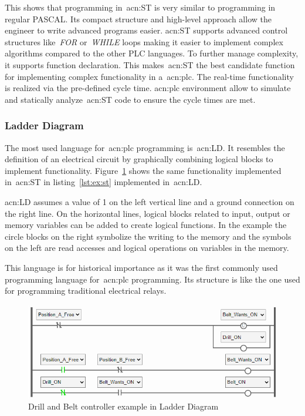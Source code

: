 This shows that programming in~\acrshort{acn:ST} is very similar to programming in regular PASCAL.
Its compact structure and high-level approach allow the engineer to write advanced programs easier.
\acrshort{acn:ST} supports advanced control structures like~\textit{FOR} or~\textit{WHILE} loops making it easier to implement complex algorithms compared to the other PLC languages. 
To further manage complexity, it supports function declaration.
This makes~\acrshort{acn:ST} the best candidate function for implementing complex functionality in a~\acrshort{acn:plc}.
The real-time functionality is realized via the pre-defined cycle time.
\acrshort{acn:plc} environment allow to simulate and statically analyze~\acrshort{acn:ST} code to ensure the cycle times are met.

\subsubsection{Ladder Diagram}

The most used language for~\acrshort{acn:plc} programming is~\acrfull{acn:LD}.
It resembles the definition of an electrical circuit by graphically combining logical blocks to implement functionality.
Figure~\ref{fig:drill:ld} shows the same functionality implemented in~\acrshort{acn:ST} in listing~\ref{lst:ex:st} implemented in~\acrshort{acn:LD}.

\acrshort{acn:LD} assumes a value of 1 on the left vertical line and a ground connection on the right line.
On the horizontal lines, logical blocks related to input, output or memory variables can be added to create logical functions.
In the example the circle blocks on the right symbolize the writing to the memory and the symbols on the left are read accesses and logical operations on variables in the memory.

This language is for historical importance as it was the first commonly used programming language for~\acrshort{acn:plc} programming.
Its structure is like the one used for programming traditional electrical relays.

\begin{figure}[h]
	\includegraphics[width=\textwidth]{Figures/belt_drill_ld.png}
	\caption[Drill and Belt controller example in Ladder Diagram]{Drill and Belt controller example in Ladder Diagram}
	\label{fig:drill:ld}
\end{figure}